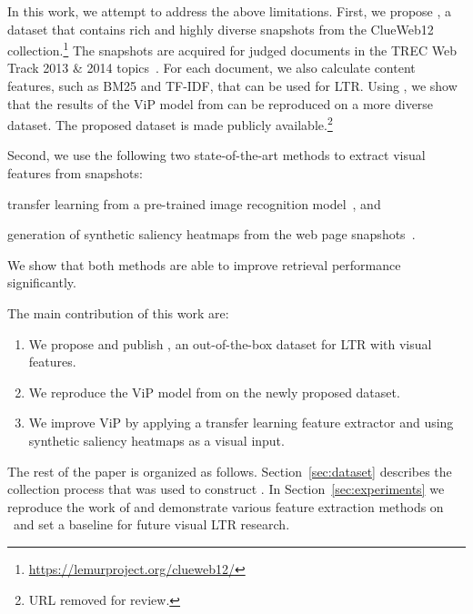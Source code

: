 
In this work, we attempt to address the above limitations.
First, we propose \datasetname, a dataset that contains rich and highly diverse snapshots from the ClueWeb12 collection.\footnote{\url{https://lemurproject.org/clueweb12/}} The snapshots are acquired for judged documents in the TREC Web Track 2013 \& 2014 topics~\cite{collins2013trec,collins2015trec}. For each document, we also calculate content features, such as BM25 and TF-IDF, that can be used for \ac{LTR}.
%
Using \datasetname, we show that the results of the ViP model from \citet{fan2017learning} can be reproduced on a more diverse dataset.
The proposed dataset is made publicly available.\footnote{URL removed for review.}

Second, we use the following two state-of-the-art methods to extract visual features from snapshots:
\begin{inparaenum}[(i)]
\item transfer learning from a pre-trained image recognition model~\cite{donahue2014decaf,simonyan2014very}, and
\item generation of synthetic saliency heatmaps from the web page snapshots~\cite{shen2014webpage,shan2017two}.
\end{inparaenum}
We show that both methods are able to improve retrieval performance significantly.

The main contribution of this work are:
\begin{enumerate}  
\item We propose and publish \datasetname, an out-of-the-box dataset for \ac{LTR} with visual features.
\item We reproduce the ViP model from \cite{fan2017learning} on the newly proposed dataset.
\item We improve ViP by applying a transfer learning feature extractor and using synthetic saliency heatmaps as a visual input.
\end{enumerate}

 The rest of the paper is organized as follows. Section~\ref{sec:dataset} describes the collection process that was used to construct \datasetname. In Section~\ref{sec:experiments} we reproduce the work of \citet{fan2017learning} and demonstrate various feature extraction methods on \datasetname~and set a baseline for future visual \ac{LTR} research.  